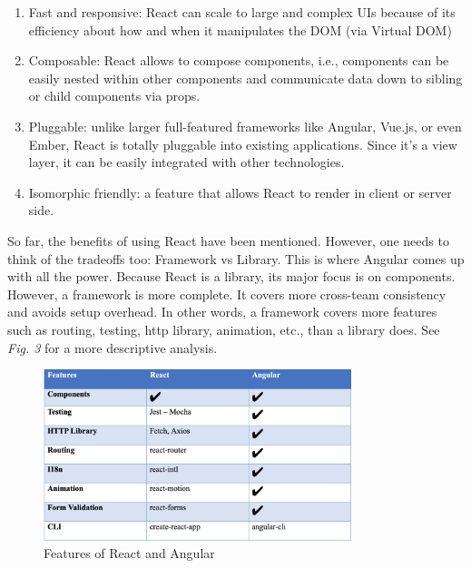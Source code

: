 \begin{enumerate}
    \item Fast and responsive: React can scale to large and complex UIs because of its efficiency about how and when it manipulates the DOM (via Virtual DOM)
    \item Composable: React allows to compose components, i.e., components can be easily nested within other components and communicate data down to sibling or child components via props.
    \item Pluggable: unlike larger full-featured frameworks like Angular, Vue.js, or even Ember, React is totally pluggable into existing applications. Since it’s a view layer, it can be easily integrated with other technologies.
    \item Isomorphic friendly: a feature that allows React to render in client or server side.
\end{enumerate}

\vspace{0.5cm}

So far, the benefits of using React have been mentioned. However, one needs to think of the tradeoffs too: Framework vs Library. This is where Angular comes up with all the power. Because React is a library, its major focus is on components. However, a framework is more complete. It covers more cross-team consistency and avoids setup overhead. In other words, a framework covers more features such as routing, testing, http library, animation, etc., than a library does. See \textit{Fig. 3} for a more descriptive analysis.\\

\begin{figure}
    \centering
        \includegraphics[width=0.8\textwidth]{images/table.png}
        \caption{Features of React and Angular}
\end{figure}

\vspace{0.5cm}

